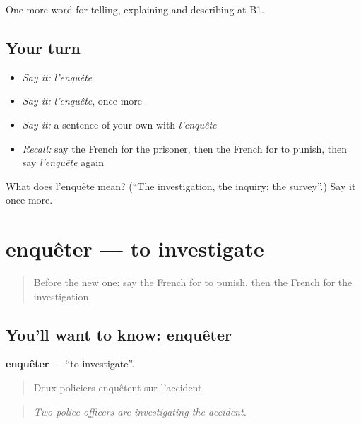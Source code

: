 \begin{grammarlens}[title={What you've built}]
One more word for telling, explaining and describing at B1.
\end{grammarlens}

\subsection*{Your turn}
\begin{itemize}
\raggedright
  \item \emph{Say it:} \emph{l'enquête}
  \item \emph{Say it:} \emph{l'enquête}, once more
  \item \emph{Say it:} a sentence of your own with \emph{l'enquête}
  \item \emph{Recall:} say the French for the prisoner, then the French for to punish, then say \emph{l'enquête} again
\end{itemize}

\begin{tcolorbox}[breakable,colback=teal!4,colframe=teal!35!black,title={Before you move on}]
What does l'enquête mean? (\textquotedblleft{}The investigation, the inquiry; the survey\textquotedblright{}.) Say it once more.
\end{tcolorbox}
\section[enquêter]{enquêter — to investigate}

\label{lesson:FR-C389-enqueter}



\begin{quote}
Before the new one: say the French for to punish, then the French for the investigation.
\end{quote}

\subsection*{You'll want to know: enquêter}
\textbf{enquêter} — \textquotedblleft{}to investigate\textquotedblright{}.

\begin{quote}
Deux policiers enquêtent sur l'accident.
\end{quote}

\begin{quote}
\emph{Two police officers are investigating the accident.}
\end{quote}

